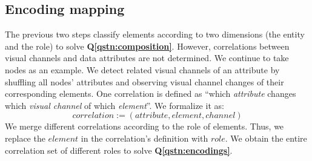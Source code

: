 \subsection{Encoding mapping}\label{sec:encodingmapping}
The previous two steps classify elements according to two dimensions (the entity and the role) to solve \textbf{Q\ref{qstn:composition}}.
However, correlations between visual channels and data attributes are not determined.
We continue to take nodes as an example.
We detect related visual channels of an attribute by shuffling all nodes' attributes and observing visual channel changes of their corresponding elements.
One correlation is defined as ``which \textit{attribute} changes which \textit{visual channel} of which \textit{element}''. We formalize it as:
\begin{equation}
    correlation := ( attribute, element, channel )
\end{equation}
We merge different correlations according to the role of elements.
Thus, we replace the $element$ in the correlation's definition with $role$.
We obtain the entire correlation set of different roles to solve \textbf{Q\ref{qstn:encodings}}.

